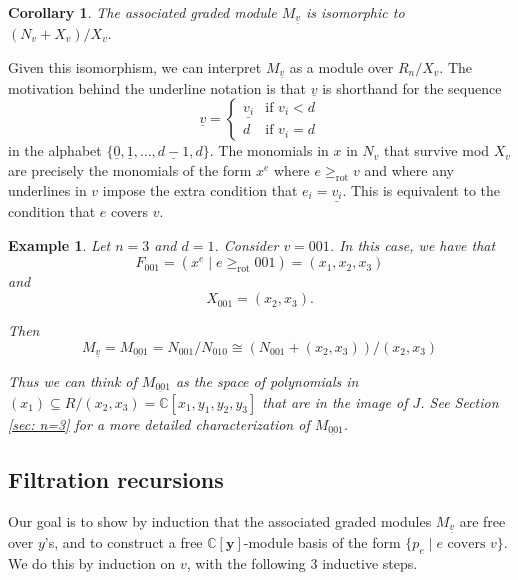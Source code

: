 \documentclass[submission]{FPSAC2027}
\newcommand{\C}{\mathbb{C}}
\newcommand{\rot}{\geq_{\mathrm{rot}}}
\newcommand{\uv}{\underline{v}}
\newcommand{\Y}{\C[\mathbf{y}]}
\newtheorem{cor}[thm]{Corollary}
\newtheorem{example}[thm]{Example}
\begin{document}
\begin{cor}
\label{cor: Mv + Xv}
    The associated graded module $M_{\uv}$ is isomorphic to $\left(N_v + X_v \right)/X_v.$
\end{cor}

Given this isomorphism, we can interpret $M_{\uv}$ as a module over $R_n/X_v$. The motivation behind the underline notation is that $\uv$ is shorthand for the sequence 
$$\uv = \begin{cases}
         \underline{v_i} & \text{if } v_i < d \\
        d  & \text{if } v_i = d
        \end{cases}$$
in the alphabet $\{\underline{0}, \underline{1}, \dots, \underline{d-1}, d\}$. The monomials in $x$ in $N_v$ that survive mod $X_v$ are precisely the monomials of the form $x^e$ where $e \rot v$ and where any underlines in $v$ impose the extra condition that $e_i = \underline{v_i}$. This is equivalent to the condition that $e$ covers $v$.

\begin{example}
    Let $n=3$ and $d=1$. Consider $v = 001$. In this case, we have that $$F_{001} = (x^e \mid e \rot 001) = (x_1, x_2, x_3)$$ and $$X_{001} = (x_2, x_3).$$
    
    Then
    $$M_{\uv} = M_{\underline{00}1} = N_{001}/N_{010} \cong \left(N_{001} + (x_2, x_3)\right)/(x_2, x_3)$$

    Thus we can think of $M_{\underline{00}1}$ as the space of polynomials in $(x_1) \subseteq R/(x_2,x_3) = \C[x_1, y_1, y_2, y_3]$ that are in the image of $J$. See Section \ref{sec: n=3} for a more detailed characterization of $M_{\underline{00}1}$.
\end{example}

\subsection{Filtration recursions}

Our goal is to show by induction that the associated graded modules $M_{\uv}$ are free over $y$'s, and to construct a free $\Y$-module basis of the form $\{p_e \mid e \textrm{ covers } v\}$. We do this by induction on $v$, with the following 3 inductive steps.
\end{document}
